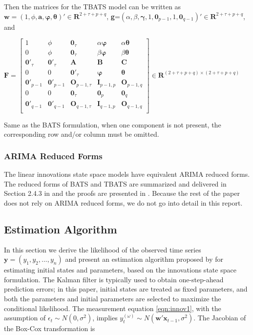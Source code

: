 \documentclass{uwstat572}
\begin{document}
Then the matrices for the TBATS model can be written as $\textbf{w}=(1,\phi,\textbf{a}, \bm{\varphi}, \bm{\theta})' \in \mathbf{R}^{2+\tau+p+q}$, \textbf{g}=$(\alpha,\beta,\bm{\gamma}, 1, \textbf{0}_{p-1}, 1, \textbf{0}_{q-1})'\in \mathbf{R}^{2+\tau+p+q}$, and 

\begin{center}
$\textbf{F}=\begin{bmatrix} 
1 & \phi& \textbf{0}_\tau & \alpha \bm{\varphi} & \alpha \bm{\theta}  \\
0 & \phi& \textbf{0}_\tau & \beta \bm{\varphi} & \beta \bm{\theta}  \\
\textbf{0}'_\tau &  \textbf{0}'_\tau  & \bm{A} & \bm{B} & \bm{C} \\
0 & 0 & \textbf{0}'_\tau & \bm{\varphi} & \bm{\theta}  \\
\bm{0}'_{p-1} & \bm{0}'_{p-1} & \textbf{O}_{p-1,\tau} & \bm{I}_{p-1,p} &\textbf{O}_{p-1,q} \\
0 & 0 &\textbf{0}_\tau & \textbf{0}_p & \textbf{0}_q \\
\bm{0}'_{q-1} & \bm{0}'_{q-1} & \textbf{O}_{q-1,\tau} & \bm{I}_{q-1,p} &\textbf{O}_{q-1,q} \\
\end{bmatrix} \in \mathbf{R}^{(2+\tau+p+q) \times (2+\tau+p+q)}$ 
\end{center}

\noindent Same as the BATS formulation, when one component is not present, the corresponding row and/or column must be omitted.

\subsubsection{ARIMA Reduced Forms}
The linear innovations state space models have equivalent ARIMA reduced forms. The reduced forms of BATS and TBATS are summarized and delivered in Section 2.4.3 in \citet{de2011forecasting} and the proofs are presented in \citet{dethesis}. Because the rest of the paper does not rely on ARIMA reduced forms, we do not go into detail in this report. 

\subsection{Estimation Algorithm}
In this section we derive the likelihood of the observed time series $\textbf{y}=(y_1,y_2,...,y_n)$ and present an estimation algorithm proposed by \citet{de2011forecasting} for estimating initial states and parameters, based on the innovations state space formulation. The Kalman filter is typically used to obtain one-step-ahead prediction errors; in this paper, initial states are treated as fixed parameters, and both the parameters and initial parameters are selected to maximize the conditional likelihood. The measurement equation \ref{eqn:innov1}, with the assumption of $\epsilon_t \sim N(0,\sigma^2)$, implies $y_t^{(\omega)} \sim N(\textbf{w}'\textbf{x}_{t-1},\sigma^2)$. The Jacobian of the Box-Cox transformation is
\end{document}
